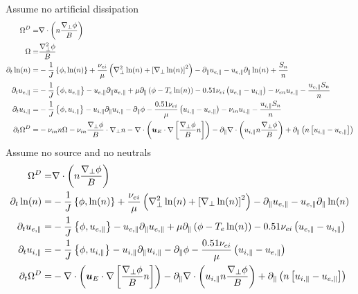 Assume no artificial dissipation
\begin{align*}
\Om^D =& \div\L(n\frac{\grad_\perp\phi}{B}\R)
\\
%
%
%
\Om =& \frac{\grad_\perp^2\phi }{B}
\\
%
%
%
\partial_t \ln(n)
=&
 -\frac{1}{J}\L\{\phi,\ln(n)\R\}
 +\frac{\nu_{ei}}{\mu}
 \L(
   \grad_\perp^2 \ln(n)
   + \L[\grad_\perp \ln(n)\R]^2
\R)
- \partial_\|u_{e,\|}
- u_{e,\|} \partial_\| \ln(n)
 + \frac{S_n}{n}
\\
%
%
%
\partial_t u_{e,\|}
 =&
 -\frac{1}{J}\L\{\phi,u_{e,\|}\R\}
 - u_{e,\|} \partial_\| u_{e,\|}
 + \mu \partial_\| \L(\phi - T_e  \ln(n)\R)
 - 0.51 \nu_{ei} \L(u_{e,\|}-u_{i,\|}\R)
 - \nu_{en} u_{e,\|}
 - \frac{u_{e,\|}S_{n}}{n}
\\
%
%
%
\partial_t u_{i,\|}
 =&
 -\frac{1}{J}\L\{\phi,u_{i,\|}\R\}
 - u_{i,\|} \partial_\| u_{i,\|}
 - \partial_\|\phi
 - \frac{ 0.51 \nu_{ei} }{ \mu } \L(u_{i,\|}-u_{e,\|}\R)
 - \nu_{in} u_{i,\|}
 - \frac{u_{i,\|}S_{n}}{n}
\\
%
%
%
  \partial_t \Om^D
  =&
  - \nu_{in} n\Om - \nu_{in} \frac{\grad_\perp \phi}{B} \cdot \grad_\perp n
  - \div \L( \ve{u}_E\cdot\nabla \L[\frac{\grad_\perp \phi}{B}n \R] \R)
  - \partial_\|\div \L( u_{i,\|}n \frac{\grad_\perp \phi}{B}\R)
 + \partial_\| \L(n\L[ u_{i,\|} - u_{e,\|} \R]\R)
\end{align*}
Assume no source and no neutrals
\begin{align*}
\Om^D =& \div\L(n\frac{\grad_\perp\phi}{B}\R)
\\
%
%
%
\partial_t \ln(n)
=&
 -\frac{1}{J}\L\{\phi,\ln(n)\R\}
 +\frac{\nu_{ei}}{\mu}
 \L(
   \grad_\perp^2 \ln(n)
   + \L[\grad_\perp \ln(n)\R]^2
\R)
- \partial_\|u_{e,\|}
- u_{e,\|} \partial_\| \ln(n)
\\
%
%
%
\partial_t u_{e,\|}
 =&
 -\frac{1}{J}\L\{\phi,u_{e,\|}\R\}
 - u_{e,\|} \partial_\| u_{e,\|}
 + \mu \partial_\| \L(\phi - T_e  \ln(n)\R)
 - 0.51 \nu_{ei} \L(u_{e,\|}-u_{i,\|}\R)
\\
%
%
%
\partial_t u_{i,\|}
 =&
 -\frac{1}{J}\L\{\phi,u_{i,\|}\R\}
 - u_{i,\|} \partial_\| u_{i,\|}
 - \partial_\|\phi
 - \frac{ 0.51 \nu_{ei} }{ \mu } \L(u_{i,\|}-u_{e,\|}\R)
\\
%
%
%
  \partial_t \Om^D
  =&
  - \div \L( \ve{u}_E\cdot\nabla \L[\frac{\grad_\perp \phi}{B}n \R] \R)
  - \partial_\|\div \L( u_{i,\|}n \frac{\grad_\perp \phi}{B}\R)
 + \partial_\| \L(n\L[ u_{i,\|} - u_{e,\|} \R]\R)
\end{align*}
